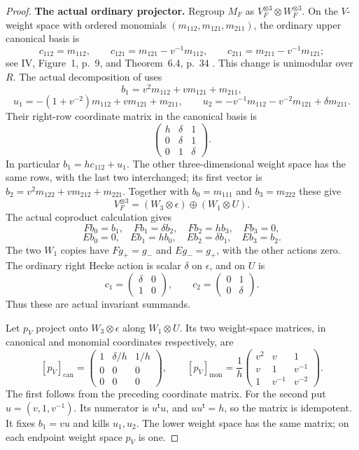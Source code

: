 \begin{proof}
\par\smallskip\noindent\textbf{The actual ordinary projector.}\quad
Regroup $M_F$ as $V_F^{\otimes3}\otimes W_F^{\otimes3}$.
On the $V$-weight space with ordered monomials
$(m_{112},m_{121},m_{211})$, the ordinary upper canonical basis is
\[
 c_{112}=m_{112},\qquad
 c_{121}=m_{121}-v^{-1}m_{112},\qquad
 c_{211}=m_{211}-v^{-1}m_{121};
\]
see IV, Figure~1, p.~9, and Theorem~6.4, p.~34 \cite{IV}.
This change is unimodular over $R$.
The actual decomposition of  uses
\[
 b_1=v^2m_{112}+v m_{121}+m_{211},
\]
\[
 u_1=-(1+v^{-2})m_{112}+v m_{121}+m_{211},\qquad
 u_2=-v^{-1}m_{112}-v^{-2}m_{121}+\delta m_{211}.
\]
Their right-row coordinate matrix in the canonical basis is
\[
 \begin{pmatrix}
 h&\delta&1\\
 0&\delta&1\\
 0&1&\delta
 \end{pmatrix}.
\]
In particular $b_1=h c_{112}+u_1$.
The other three-dimensional weight space has the same rows,
with the last two interchanged; its first vector is
$b_2=v^2m_{122}+v m_{212}+m_{221}$.
Together with $b_0=m_{111}$ and $b_3=m_{222}$ these give
\[
 V_F^{\otimes3}
 =(W_3\otimes\epsilon)\oplus(W_1\otimes U).
\]
The actual coproduct calculation gives
\[
 Fb_0=b_1,\quad Fb_1=\delta b_2,\quad Fb_2=h b_3,\quad Fb_3=0,
\]
\[
 Eb_0=0,\quad Eb_1=h b_0,\quad Eb_2=\delta b_1,\quad Eb_3=b_2.
\]
The two $W_1$ copies have $Fg_+=g_-$ and $Eg_-=g_+$,
with the other actions zero. The ordinary right Hecke action
is scalar $\delta$ on $\epsilon$, and on $U$ is
\[
 c_1=\begin{pmatrix}\delta&0\\1&0\end{pmatrix},
 \qquad
 c_2=\begin{pmatrix}0&1\\0&\delta\end{pmatrix}.
\]
Thus these are actual invariant summands.

Let $p_V$ project onto $W_3\otimes\epsilon$ along $W_1\otimes U$.
Its two weight-space matrices, in canonical and monomial
coordinates respectively, are
\[
 [p_V]_{\mathrm{can}}=
 \begin{pmatrix}
 1&\delta/h&1/h\\
 0&0&0\\
 0&0&0
 \end{pmatrix},
 \qquad
 [p_V]_{\mathrm{mon}}=
 \frac1h
 \begin{pmatrix}
 v^2&v&1\\
 v&1&v^{-1}\\
 1&v^{-1}&v^{-2}
 \end{pmatrix}.
\]
The first follows from the preceding coordinate matrix.
For the second put $u=(v,1,v^{-1})$.
Its numerator is $u^{\mathsf t}u$, and $u u^{\mathsf t}=h$,
so the matrix is idempotent. It fixes $b_1=v u$ and kills
$u_1,u_2$. The lower weight space has the same matrix;
on each endpoint weight space $p_V$ is one.


\end{proof}
